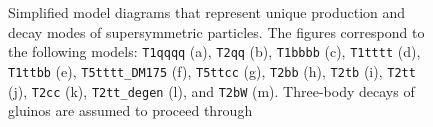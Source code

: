 \begin{figure}[!h]
\begin{center}
    ~~
    ~~
    \\
    ~~
    ~~
   \caption{ Simplified model diagrams that represent unique
     production and decay modes of supersymmetric particles. The
     figures correspond to the following models: \texttt{T1qqqq} (a),
     \texttt{T2qq} (b), \texttt{T1bbbb} (c), \texttt{T1tttt} (d),
     \texttt{T1ttbb} (e), \texttt{T5tttt\_DM175} (f), \texttt{T5ttcc}
     (g), \texttt{T2bb} (h), \texttt{T2tb} (i), \texttt{T2tt} (j),
     \texttt{T2cc} (k), \texttt{T2tt\_degen} (l), and \texttt{T2bW}
     (m). Three-body decays of gluinos are assumed to proceed through
}
\end{center}
\end{figure}
